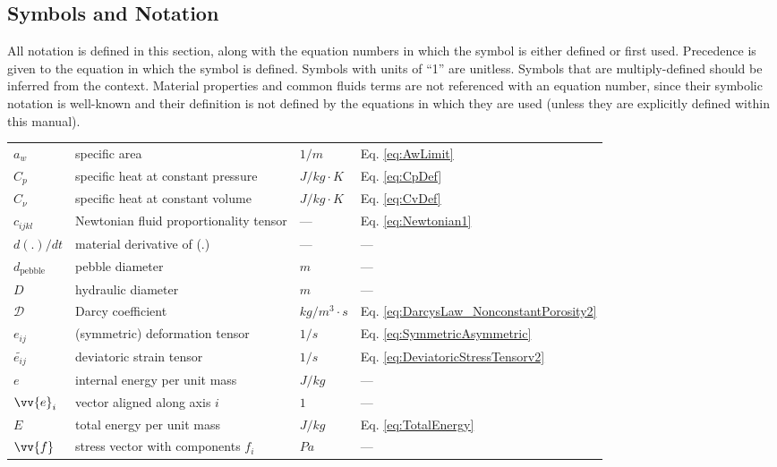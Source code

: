 \documentclass[10pt]{article}
\numberwithin{equation}{section} %
\begin{document}
\subsection{Symbols and Notation}
All notation is defined in this section, along with the equation numbers in which the symbol is either defined or first used. Precedence is given to the equation in which the symbol is defined. Symbols with units of ``1'' are unitless. Symbols that are multiply-defined should be inferred from the context. Material properties and common fluids terms are not referenced with an equation number, since their symbolic notation is well-known and their definition is not defined by the equations in which they are used (unless they are explicitly defined within this manual).\newline

\begin{tabular}{l l l l}
\(a_w\)				& specific area								& \(1/m\)				& Eq. \eqref{eq:AwLimit}\\
\(C_p\)				& specific heat at constant pressure				& \(J/kg\cdot K\)		& Eq. \eqref{eq:CpDef}\\
\(C_\nu\)				& specific heat at constant volume				& \(J/kg\cdot K\)		& Eq. \eqref{eq:CvDef}\\
\(c_{ijkl}\)				& Newtonian fluid proportionality tensor			& ---					& Eq. \eqref{eq:Newtonian1}\\
\(d(.)/dt\)				& material derivative	of (.)						& --- 					& ---\\
\(d_{\textrm{pebble}}\)	& pebble diameter							& \(m\)				& ---\\
\(D\)					& hydraulic diameter							& \(m\)				& ---\\
\(\mathscr{D}\)			& Darcy coefficient							& \(kg/m^3\cdot s\)		& Eq. \eqref{eq:DarcysLaw_NonconstantPorosity2}\\
\(e_{ij}\)				& (symmetric) deformation tensor				& \(1/s\)				& Eq. \eqref{eq:SymmetricAsymmetric}\\
\(\tilde{e_{ij}}\)			& deviatoric strain tensor						& \(1/s\)				& Eq. \eqref{eq:DeviatoricStressTensorv2}\\
\(e\)					& internal energy per unit mass					& \(J/kg\)				& ---\\
\(\vv{e}_i\)				& vector aligned along axis \(i\)					& \(1\)				& ---\\
\(E\)					& total energy per unit mass					& \(J/kg\)				& Eq. \eqref{eq:TotalEnergy}\\
\(\vv{f}\)				& stress vector with components \(f_i\)			& \(Pa\)				& ---\\

\end{tabular}
\end{document}
